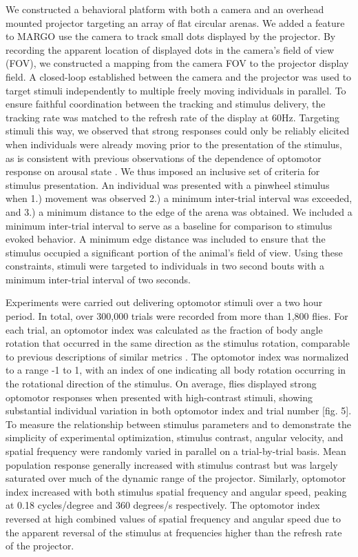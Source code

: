 \documentclass[10pt]{article}
\begin{document}
\begin{multicols}{2}
We constructed a behavioral platform with both a camera and an overhead mounted projector targeting an array of flat circular arenas. We added a feature to MARGO use the camera to track small dots displayed by the projector. By recording the apparent location of displayed dots in the camera's field of view (FOV), we constructed a mapping from the camera FOV to the projector display field. A closed-loop established between the camera and the projector was used to target stimuli independently to multiple freely moving individuals in parallel. To ensure faithful coordination between the tracking and stimulus delivery, the tracking rate was matched to the refresh rate of the display at 60Hz. Targeting stimuli this way, we observed that strong responses could only be reliably elicited when individuals were already moving prior to the presentation of the stimulus, as is consistent with previous observations of the dependence of optomotor response on arousal state \cite{Zhu_Peripheral_2009,Kim_Fly_2016}. We thus imposed an inclusive set of criteria for stimulus presentation. An individual was presented with a pinwheel stimulus when 1.) movement was observed 2.) a minimum inter-trial interval was exceeded, and 3.) a minimum distance to the edge of the arena was obtained. We included a minimum inter-trial interval to serve as a baseline for comparison to stimulus evoked behavior. A minimum edge distance was included to ensure that the stimulus occupied a significant portion of the animal's field of view. Using these constraints, stimuli were targeted to individuals in two second bouts with a minimum inter-trial interval of two seconds. 

Experiments were carried out delivering optomotor stimuli over a two hour period. In total, over 300,000 trials were recorded from more than 1,800 flies. For each trial, an optomotor index was calculated as the fraction of body angle rotation that occurred in the same direction as the stimulus rotation, comparable to previous descriptions of similar metrics \cite{Seelig_Two_2010}. The optomotor index was normalized to a range -1 to 1, with an index of one indicating all body rotation occurring in the rotational direction of the stimulus. On average, flies displayed strong optomotor responses when presented with high-contrast stimuli, showing substantial individual variation in both optomotor index and trial number [fig. 5]. To measure the relationship between stimulus parameters and to demonstrate the simplicity of experimental optimization, stimulus contrast, angular velocity, and spatial frequency were randomly varied in parallel on a trial-by-trial basis. Mean population response generally increased with stimulus contrast but was largely saturated over much of the dynamic range of the projector. Similarly, optomotor index increased with both stimulus spatial frequency and angular speed, peaking at 0.18 cycles/degree and 360 degrees/s respectively. The optomotor index reversed at high combined values of spatial frequency and angular speed due to the apparent reversal of the stimulus at frequencies higher than the refresh rate of the projector.



\end{multicols}
\end{document}
